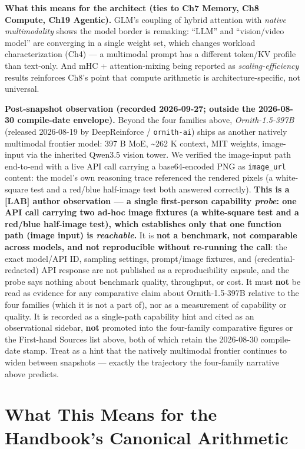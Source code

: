 \textbf{What this means for the architect (ties to Ch7 Memory, Ch8
Compute, Ch19 Agentic).} GLM's coupling of hybrid attention with
\emph{native multimodality} shows the model border is remaking: ``LLM''
and ``vision/video model'' are converging in a single weight set, which
changes workload characterization (Ch4) --- a multimodal prompt has a
different token/KV profile than text-only. And mHC + attention-mixing
being reported as \emph{scaling-efficiency} results reinforces Ch8's
point that compute arithmetic is architecture-specific, not universal.

\textbf{Post-snapshot observation (recorded 2026-09-27; outside the
2026-08-30 compile-date envelope).} Beyond the four families above,
\emph{Ornith-1.5-397B} (released 2026-08-19 by DeepReinforce /
\texttt{ornith-ai}) ships as another natively multimodal frontier model:
397 B MoE, \textasciitilde262 K context, MIT weights, image-input via
the inherited Qwen3.5 vision tower. We verified the image-input path
end-to-end with a live API call carrying a base64-encoded PNG as
\texttt{image\_url} content: the model's own reasoning trace referenced
the rendered pixels (a white-square test and a red/blue half-image test
both answered correctly). \textbf{This is a \mbox{{[}LAB{]}} author observation
--- a single first-person capability \emph{probe}: one API call carrying
two ad-hoc image fixtures (a white-square test and a red/blue half-image
test), which establishes only that one function path (image input) is
\emph{reachable}.} It is \textbf{not a benchmark, not comparable across
models, and not reproducible without re-running the call}: the exact
model/API ID, sampling settings, prompt/image fixtures, and
(credential-redacted) API response are not published as a
reproducibility capsule, and the probe says nothing about benchmark
quality, throughput, or cost. It must \textbf{not} be read as evidence
for any comparative claim about Ornith-1.5-397B relative to the four
families (which it is not a part of), nor as a measurement of capability
or quality. It is recorded as a single-path capability hint and cited as
an observational sidebar, \textbf{not} promoted into the four-family
comparative figures or the First-hand Sources list above, both of which
retain the 2026-08-30 compile-date stamp. Treat as a hint that the
natively multimodal frontier continues to widen between snapshots ---
exactly the trajectory the four-family narrative above predicts.

\section{What This Means for the Handbook's Canonical
Arithmetic}\label{what-this-means-for-the-handbooks-canonical-arithmetic}

